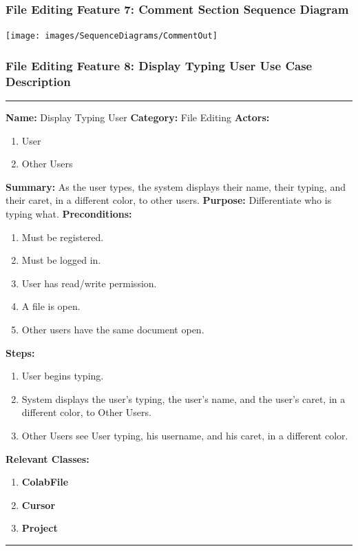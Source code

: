 \documentclass[twoside,letterpaper]{article}
\begin{document}
\subsubsection[File Editing Feature 7: Comment Section Sequence Diagram]{\rmfamily\bfseries\color{black}
	File Editing Feature 7: Comment Section Sequence Diagram}
\hypertarget{RefHeading22059017292}{}

\bigskip

\texttt{[image: images/SequenceDiagrams/CommentOut]}

\newpage

\subsubsection[File Editing Feature 8: Display Typing User]{\rmfamily\bfseries\color{black}
	File Editing Feature 8: Display Typing User Use Case Description}
\hypertarget{RefHeading22059017292}{}

\vspace{2pt}
\hrule
\vspace{8pt}
	\noindent\textbf{Name:} Display Typing User \newline
	\noindent\textbf{Category:} File Editing \newline
	\noindent\textbf{Actors:} 
	\begin{enumerate}
		\item User
		\item Other Users
	\end{enumerate}
	\noindent\textbf{Summary:} As the user types, the system displays their name, their typing, and their caret, in a different color, to other users. \newline
	\noindent\textbf{Purpose:} Differentiate who is typing what. \newline
	\noindent\textbf{Preconditions:}
	\begin{enumerate}
		\item Must be registered.
		\item Must be logged in.
		\item User has read/write permission.
		\item A file is open.
		\item Other users have the same document open.
	\end{enumerate}
	\noindent\textbf{Steps:}
	\begin{enumerate}
		\item User begins typing.
		\item System displays the user's typing, the user's name, and the user's caret, in a different color, to Other Users.
		\item Other Users see User typing, his username, and his caret, in a different color.
	\end{enumerate}
	\noindent\textbf{Relevant Classes:}
	\begin{enumerate}
	   \item \textbf {ColabFile}
	   \item \textbf {Cursor}
	   \item \textbf {Project}
	\end{enumerate}
\vspace{8pt}
\hrule
\newpage
\end{document}
